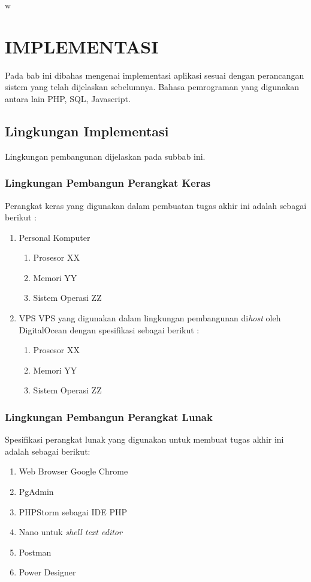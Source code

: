 w\chapter{IMPLEMENTASI}
  Pada bab ini dibahas mengenai implementasi aplikasi sesuai dengan perancangan sistem yang telah dijelaskan sebelumnya. Bahasa pemrograman yang digunakan antara lain PHP, SQL, Javascript.
  
  \section{Lingkungan Implementasi}
  Lingkungan pembangunan dijelaskan pada subbab ini.
  \subsection{Lingkungan Pembangun Perangkat Keras}
  Perangkat keras yang digunakan dalam pembuatan tugas akhir ini adalah sebagai berikut :
  \begin{enumerate}
  \item Personal Komputer
  		\begin{enumerate}
  		\item Prosesor XX
        \item Memori YY
        \item Sistem Operasi ZZ
  		\end{enumerate}
  \item VPS
  	VPS yang digunakan dalam lingkungan pembangunan di\textit{host} oleh DigitalOcean dengan spesifikasi sebagai berikut :
  		\begin{enumerate}
  		\item Prosesor XX
        \item Memori YY
        \item Sistem Operasi ZZ
  		\end{enumerate}
  \end{enumerate}
  
  \subsection{Lingkungan Pembangun Perangkat Lunak}
  Spesifikasi perangkat lunak yang digunakan untuk membuat tugas akhir ini adalah sebagai berikut:
  \begin{enumerate}
  \item Web Browser Google Chrome
  \item PgAdmin
  \item PHPStorm sebagai IDE PHP
  \item Nano untuk \textit{shell text editor}
  \item Postman
  \item Power Designer
  \end{enumerate}
  
